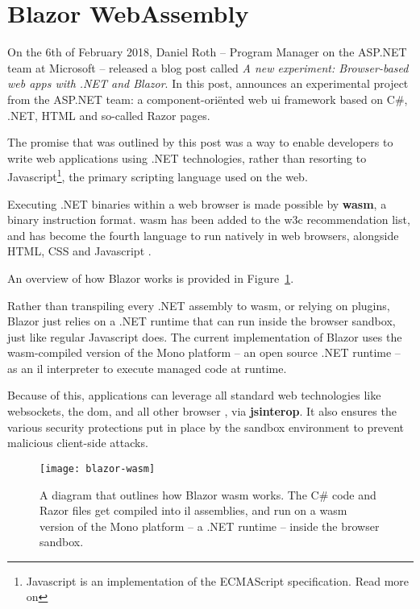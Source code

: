 \section{Blazor WebAssembly}

On the 6th of February 2018, Daniel Roth -- Program Manager on the ASP.NET team
at Microsoft -- released a blog post called \textit{A new experiment:
Browser-based web apps with .NET and Blazor}. In this post, \textcite{Roth_2018}
announces an experimental project from the ASP.NET team: a component-ori\"ented
web \gls{ui} framework based on C\#, .NET, HTML and so-called Razor pages. 

The promise that was outlined by this post was a way to enable developers to
write web applications using .NET technologies, rather than resorting to
Javascript\footnote{Javascript is an implementation of the ECMAScript
specification. Read more on }, the
primary scripting language used on the web.

Executing .NET binaries within a web browser is made possible by
\textbf{\gls{wasm}}, a binary instruction format.
\Gls{wasm} has been added to the \gls{w3c} recommendation list, and has become
the fourth language to run natively in web browsers, alongside HTML, CSS and
Javascript \autocite{Couriol_2019}. 

An overview of how Blazor works is provided in Figure~\ref{fig:blazor-wasm}.

Rather than \gls{transpiling} every .NET assembly to \gls{wasm}, or relying on
plugins, Blazor just relies on a .NET runtime that can run inside the browser
sandbox, just like regular Javascript does. The current implementation of Blazor
uses the \gls{wasm}-compiled version of the
Mono platform -- an open source .NET
runtime -- as an \gls{il} interpreter to execute managed code at runtime.

Because of this, applications can leverage all standard web technologies like
websockets, the \gls{dom}, and all other browser , via
\textbf{\gls{jsinterop}}. It also ensures the various security protections put
in place by the sandbox environment to prevent malicious client-side attacks.

\begin{figure}
  \centering
  \texttt{[image: blazor-wasm]}
  \caption[Blazor WebAssembly]{A diagram that outlines how Blazor \gls{wasm}
  works. The C\# code and Razor files get compiled into \gls{il} assemblies, and
  run on a \gls{wasm} version of the Mono platform -- a .NET runtime -- inside
  the browser sandbox.}
  \label{fig:blazor-wasm}
\end{figure}


